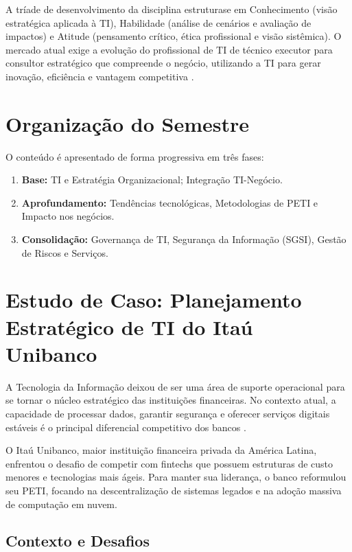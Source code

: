 \documentclass[12pt,a4paper,oneside]{article}
\begin{document}
A tríade de desenvolvimento da disciplina estruturase em Conhecimento (visão estratégica aplicada à TI), Habilidade (análise de cenários e avaliação de impactos) e Atitude (pensamento crítico, ética profissional e visão sistêmica). O mercado atual exige a evolução do profissional de TI de técnico executor para consultor estratégico que compreende o negócio, utilizando a TI para gerar inovação, eficiência e vantagem competitiva \cite{rocha2018}.

\section{Organização do Semestre}

O conteúdo é apresentado de forma progressiva em três fases:

\begin{enumerate}
  \item \textbf{Base:} TI e Estratégia Organizacional; Integração TI-Negócio.
  \item \textbf{Aprofundamento:} Tendências tecnológicas, Metodologias de PETI e Impacto nos negócios.
  \item \textbf{Consolidação:} Governança de TI, Segurança da Informação (SGSI), Gestão de Riscos e Serviços.
\end{enumerate}

\section{Estudo de Caso: Planejamento Estratégico de TI do Itaú Unibanco}

A Tecnologia da Informação deixou de ser uma área de suporte operacional para se tornar o núcleo estratégico das instituições financeiras. No contexto atual, a capacidade de processar dados, garantir segurança e oferecer serviços digitais estáveis é o principal diferencial competitivo dos bancos \cite{porter1989}.

O Itaú Unibanco, maior instituição financeira privada da América Latina, enfrentou o desafio de competir com fintechs que possuem estruturas de custo menores e tecnologias mais ágeis. Para manter sua liderança, o banco reformulou seu PETI, focando na descentralização de sistemas legados e na adoção massiva de computação em nuvem.

\subsection{Contexto e Desafios}
\end{document}

